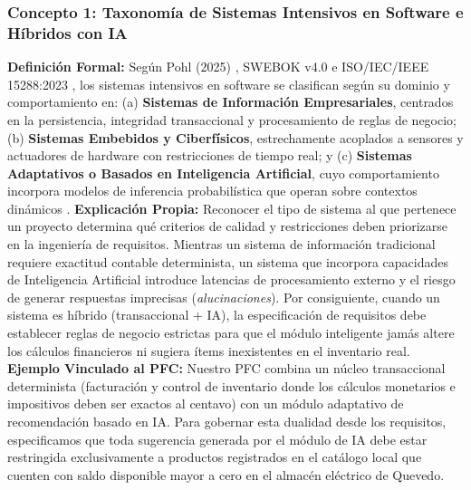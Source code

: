 \documentclass[conference,10pt]{IEEEtran}
\begin{document}
	\subsubsection{Concepto 1: Taxonomía de Sistemas Intensivos en Software e Híbridos con IA}
	\textbf{Definición Formal:} Según Pohl (2025) \cite{pohl2025}, SWEBOK v4.0 \cite{swebok2024} e ISO/IEC/IEEE 15288:2023 \cite{ieee15288}, los sistemas intensivos en software se clasifican según su dominio y comportamiento en: (a) \textbf{Sistemas de Información Empresariales}, centrados en la persistencia, integridad transaccional y procesamiento de reglas de negocio; (b) \textbf{Sistemas Embebidos y Ciberfísicos}, estrechamente acoplados a sensores y actuadores de hardware con restricciones de tiempo real; y (c) \textbf{Sistemas Adaptativos o Basados en Inteligencia Artificial}, cuyo comportamiento incorpora modelos de inferencia probabilística que operan sobre contextos dinámicos \cite{pohl2025, swebok2024}.
	\textbf{Explicación Propia:} Reconocer el tipo de sistema al que pertenece un proyecto determina qué criterios de calidad y restricciones deben priorizarse en la ingeniería de requisitos. Mientras un sistema de información tradicional requiere exactitud contable determinista, un sistema que incorpora capacidades de Inteligencia Artificial introduce latencias de procesamiento externo y el riesgo de generar respuestas imprecisas (\textit{alucinaciones}). Por consiguiente, cuando un sistema es híbrido (transaccional + IA), la especificación de requisitos debe establecer reglas de negocio estrictas para que el módulo inteligente jamás altere los cálculos financieros ni sugiera ítems inexistentes en el inventario real.
	\textbf{Ejemplo Vinculado al PFC:} Nuestro PFC combina un núcleo transaccional determinista (facturación y control de inventario donde los cálculos monetarios e impositivos deben ser exactos al centavo) con un módulo adaptativo de recomendación basado en IA. Para gobernar esta dualidad desde los requisitos, especificamos que toda sugerencia generada por el módulo de IA debe estar restringida exclusivamente a productos registrados en el catálogo local que cuenten con saldo disponible mayor a cero en el almacén eléctrico de Quevedo.
\end{document}
